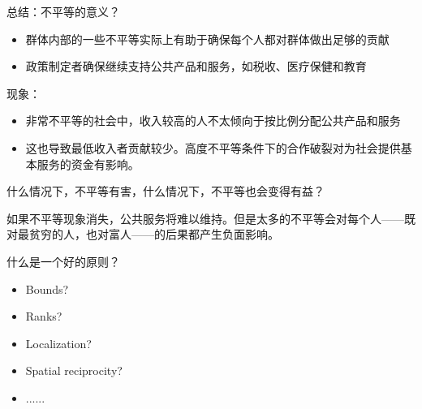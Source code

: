 \documentclass{beamer}
\begin{document}
\begin{frame}{总结：不平等的意义？}

\begin{itemize}
    \item 群体内部的一些不平等实际上有助于确保每个人都对群体做出足够的贡献
    \item 政策制定者确保继续支持公共产品和服务，如税收、医疗保健和教育
\end{itemize}
现象：
\begin{itemize}
    \item 非常不平等的社会中，收入较高的人不太倾向于按比例分配公共产品和服务
    \item 这也导致最低收入者贡献较少。高度不平等条件下的合作破裂对为社会提供基本服务的资金有影响。
\end{itemize}
\begin{center}
    什么情况下，不平等有害，什么情况下，不平等也会变得有益？
    
    如果不平等现象消失，公共服务将难以维持。但是太多的不平等会对每个人——既对最贫穷的人，也对富人——的后果都产生负面影响。
\end{center}
    
\end{frame}

\begin{frame}{什么是一个好的原则？}
    \begin{itemize}
        \item Bounds?
        \item Ranks?
        \item Localization?
        \item Spatial reciprocity?
        \item ......
    \end{itemize}
\end{frame}
\end{document}
